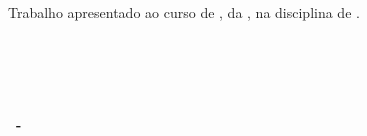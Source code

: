\documentclass[12pt,a4paper,brazil,openany,oneside]{abntex2}
\renewcommand{\headrulewidth}{0pt} %
\begin{document}
\pagestyle{fancy}
\fancyhf{}
\renewcommand{\headrulewidth}{0.2pt} %
\renewcommand{\footrulewidth}{0pt} %

\begin{titlepage}
    \thispagestyle{fancy} %
    \begin{center}
        \vspace*{\fill}
        \textbf{\LARGE \faculdade}\\[0.5cm]
        \textbf{\Large \curso}\\[0.5cm]
        \textbf{\large \nomeAutor}\\[0.5cm]
        \vfill
        \textbf{\LARGE \tituloTrabalho}\\[0.5cm]
        \vfill
        \textbf{\large \cidade}\\[0.5cm]
        \textbf{\large \the\year}
        \vspace*{\fill}
    \end{center}
\end{titlepage}

\newpage
\begin{titlepage}
    \begin{center}
        \vspace*{\fill}
        \textbf{\large \nomeAutor}\\[0.5cm]
        \textbf{\Large \tituloTrabalho}\\[0.5cm]
        \vfill
        \begin{flushright}
            \begin{minipage}{0.5\textwidth}
                Trabalho apresentado ao curso de \curso, da \faculdade, na disciplina de \disciplina.\\[0.5cm]
            \end{minipage}
        \end{flushright}
        \vfill
        \textbf{\large \fatecName\ \campus}\\[0.5cm]
        \textbf{\large \curso}\\[0.5cm]
        \textbf{\large \disciplina}\\[0.5cm]
        \vfill
        \orientadorTrabalho\\[0.5cm]
        \vfill
        \textbf{\large \cidade \ - \BRName}\\[0.5cm]
        \textbf{\large \the\year}
        \vspace*{\fill}
    \end{center}
\end{titlepage}
\end{document}
